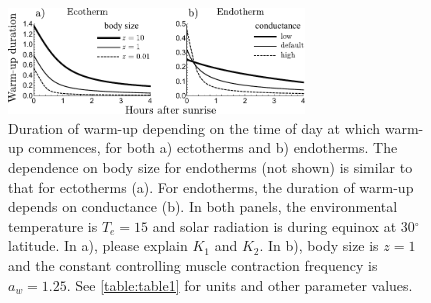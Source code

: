 \clearpage

\begin{figure}
\centering \includegraphics[width=0.7\textwidth]{fig4}
\caption{
    \setstretch{\stretchby}
    Duration of warm-up depending on the time of day at which warm-up commences, for both a) ectotherms and b) endotherms.
    The dependence on body size for endotherms (not shown) is similar to that for ectotherms (a).
    For endotherms, the duration of warm-up depends on conductance (b).
	In both panels, the environmental temperature is $T_e = 15$ and solar radiation is during equinox at 30$^\circ$ latitude.
    In a), please explain $K_1$ and $K_2$.  %
    In b), body size is $z = 1$ and the constant controlling muscle contraction frequency is $a_w = 1.25$.
	See \cref{table:table1} for units and other parameter values.
}
\label{fig4}
\end{figure}

\clearpage

